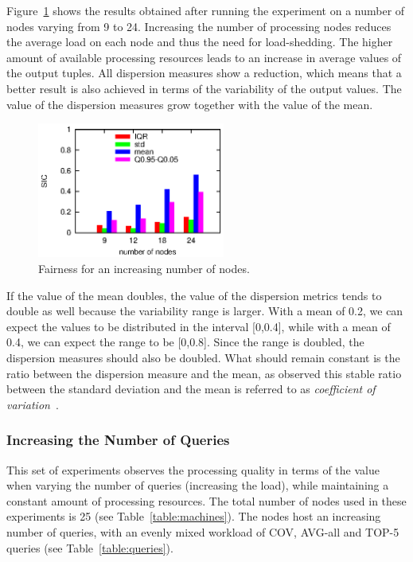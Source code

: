 Figure~\ref{fig:scalability:nodes} shows the results obtained after running the experiment on a number of
nodes varying from 9 to 24. Increasing the number of processing nodes reduces the average load
on each node and thus the need for \mbox{load-shedding}. The higher amount of available processing
resources leads to an increase in average \sic values of the output tuples. 
All dispersion measures show a reduction, which means that a better result is also achieved in terms
of the variability of the output \sic values. The value of the dispersion measures grow together with
the value of the mean. 
\begin{figure}[h!]
\centering
\includegraphics[width=0.55\textwidth]{img/tesi/nodes2}
\caption{Fairness for an increasing number of nodes.}
\label{fig:scalability:nodes}
\end{figure}
If the value of the mean doubles, the value of the dispersion metrics
tends to double as well because the variability range is larger. With a mean of 0.2, we can expect the
\sic values to be distributed in the interval [0,0.4], while with a mean of 0.4, we can expect the range
to be [0,0.8]. Since the range is doubled, the dispersion measures should also be doubled. What should
remain constant is the ratio between the dispersion measure and the mean, as observed this stable
ratio between the standard deviation and the mean is referred to as \emph{coefficient of
variation}~\cite{cvar}.
\vspace{-10pt}
\subsubsection*{Increasing the Number of Queries}

This set of experiments observes the processing quality in terms of the \sic value when varying the
number of queries (\ie increasing the load), while maintaining a constant amount of processing resources. 
The total number of nodes used in these experiments is 25 (see Table~\ref{table:machines}).
The nodes host an increasing number of queries, with an evenly mixed workload of
COV, AVG-all and TOP-5 queries (see Table~\ref{table:queries}).

